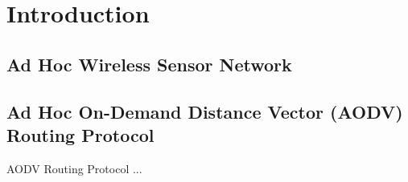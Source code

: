 \chapter{Introduction}
\label{chap:introduction}


\section{Ad Hoc Wireless Sensor Network}

\section{Ad Hoc On-Demand Distance Vector (AODV) Routing Protocol}

AODV Routing Protocol \citep{rfc3561}...




